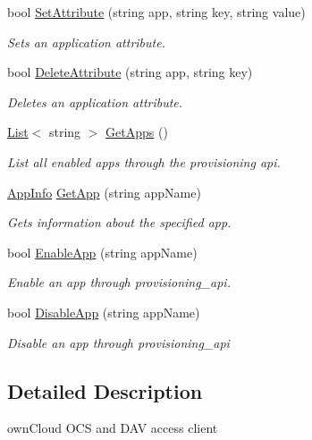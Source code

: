 \begin{DoxyCompactItemize}
bool \hyperlink{classowncloudsharp_1_1_client_a0939782439f44c5250d66147755d4c25}{Set\+Attribute} (string app, string key, string value)
\begin{DoxyCompactList}\small\item\em Sets an application attribute. \end{DoxyCompactList}\item 
bool \hyperlink{classowncloudsharp_1_1_client_ad94e83b297c9de310beafd878fd99bc4}{Delete\+Attribute} (string app, string key)
\begin{DoxyCompactList}\small\item\em Deletes an application attribute. \end{DoxyCompactList}\item 
\hyperlink{classowncloudsharp_1_1_client_a914c144ebbe207958829523f7eda3609}{List}$<$ string $>$ \hyperlink{classowncloudsharp_1_1_client_a52851315d9d1273b6f674baafe3a5840}{Get\+Apps} ()
\begin{DoxyCompactList}\small\item\em List all enabled apps through the provisioning api. \end{DoxyCompactList}\item 
\hyperlink{classowncloudsharp_1_1_types_1_1_app_info}{App\+Info} \hyperlink{classowncloudsharp_1_1_client_a55a02342fcec4161abe9c5798c36dabf}{Get\+App} (string app\+Name)
\begin{DoxyCompactList}\small\item\em Gets information about the specified app. \end{DoxyCompactList}\item 
bool \hyperlink{classowncloudsharp_1_1_client_a4023a60f6fa18288d4b9cf8cba705e7c}{Enable\+App} (string app\+Name)
\begin{DoxyCompactList}\small\item\em Enable an app through provisioning\+\_\+api. \end{DoxyCompactList}\item 
bool \hyperlink{classowncloudsharp_1_1_client_a77306ba08609c9cf128e62b955227648}{Disable\+App} (string app\+Name)
\begin{DoxyCompactList}\small\item\em Disable an app through provisioning\+\_\+api \end{DoxyCompactList}\end{DoxyCompactItemize}


\subsection{Detailed Description}
own\+Cloud O\+C\+S and D\+A\+V access client 



